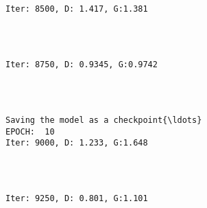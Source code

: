 \documentclass[11pt]{article}
\begin{document}
    \begin{center}
    \end{center}
    { \hspace*{\fill} \\}
    
    \begin{Verbatim}[commandchars=\\\{\}]

Iter: 8500, D: 1.417, G:1.381
    \end{Verbatim}

    \begin{center}
    \end{center}
    { \hspace*{\fill} \\}
    
    \begin{Verbatim}[commandchars=\\\{\}]

Iter: 8750, D: 0.9345, G:0.9742
    \end{Verbatim}

    \begin{center}
    \end{center}
    { \hspace*{\fill} \\}
    
    \begin{Verbatim}[commandchars=\\\{\}]

Saving the model as a checkpoint{\ldots}
EPOCH:  10
Iter: 9000, D: 1.233, G:1.648
    \end{Verbatim}

    \begin{center}
    \end{center}
    { \hspace*{\fill} \\}
    
    \begin{Verbatim}[commandchars=\\\{\}]

Iter: 9250, D: 0.801, G:1.101
    \end{Verbatim}
\end{document}
